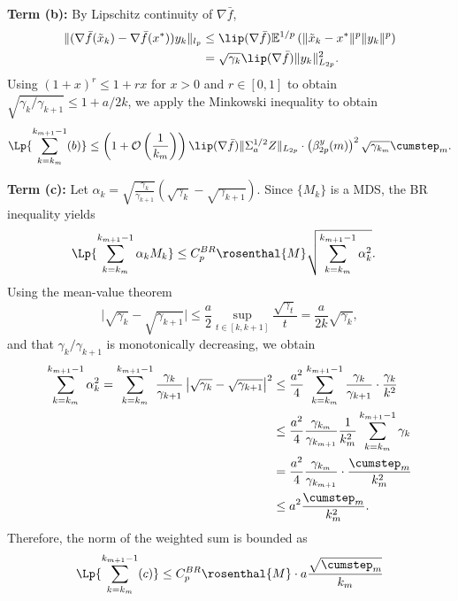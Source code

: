 \documentclass[11pt]{article}
\begin{document}
\textbf{Term (b):}
By Lipschitz continuity of $\nabla \bar{f}$, 
\begin{align*}
    \lVert  (\nabla\bar{f}(\tilde{x}_k) - \nabla \bar{f}(x^*)) y_k \rVert_{l_p}
    &\leq 
    \lip(\nabla \bar{f}) \mathbb{E}^{1/p}\left(\lVert \tilde{x}_k - x^* \rVert^p \lVert y_k \rVert^p \right)
    \\ &
    = \sqrt{\gamma_k} \lip(\nabla \bar{f}) \lVert y_k \rVert_{L_{2p}}^2 
    . 
\end{align*}
Using $(1 + x)^r \leq 1 + r x$ for $x > 0$ and $r \in [0, 1]$ to obtain $\sqrt{\gamma_k/\gamma_{k+1}} \leq 1 + a/2k$, we apply the Minkowski inequality to obtain
\begin{equation}\label{eq:bbound}
\begin{split}
    \Lp{\sum_{k=k_m}^{k_{m+1} - 1} (b)}
    \leq  
    \left(1 + \mathcal{O}\left( \frac{1}{k_m}\right) \right) \lip(\nabla \bar{f}) \lVert \Sigma_a^{1/2} Z \rVert_{L_{2p}} 
    \cdot \left(\beta_{2p}^y (m) \right)^2 \sqrt{\gamma_{k_m}}\cumstep_m
     .
\end{split}
\end{equation}


\textbf{Term (c):}
Let $\alpha_k = \sqrt{\frac{\gamma_k}{\gamma_{k+1}}} (\sqrt{\gamma_k} - \sqrt{\gamma_{k+1}})$. 
Since $\{M_k\}$ is a MDS, the BR inequality yields
\begin{align*}
    \Lp{\sum_{k=k_m}^{k_{m+1} - 1} \alpha_k M_k } 
    &\leq 
    C_p^{BR} \rosenthal{M} \sqrt{\sum_{k=k_m}^{k_{m+1} - 1} \alpha_k^2} . 
\end{align*}
Using the mean-value theorem 
\begin{equation*}
    \lvert \sqrt{\gamma_k} - \sqrt{\gamma_{k+1}} \rvert 
    \leq 
    \frac{a}{2} \sup_{t \in [k, k+1]} \frac{\sqrt{\gamma_t}}{t}
    = 
    \frac{a}{2k} \sqrt{\gamma_k} ,    
\end{equation*}
and that $\gamma_k/\gamma_{k+1}$ is monotonically decreasing, we obtain 
\begin{align*}
    \sum_{k=k_m}^{k_{m+1} - 1} \alpha_k^2 
    = \sum_{k=k_m}^{k_{m+1}-1} \frac{\gamma_k}{\gamma_{k+1}} \left\lvert \sqrt{\gamma_k} - \sqrt{\gamma_{k+1}}\right\rvert^2
    &\leq 
    \frac{a^2}{4} \sum_{k=k_m}^{k_{m+1} - 1} \frac{\gamma_{k}}{\gamma_{k+1} } \cdot \frac{\gamma_k}{k^2} 
    \\ &\leq\frac{a^2}{4} \frac{\gamma_{k_m}}{\gamma_{k_{m+1}}} \frac{1}{k_m^2} \sum_{k=k_m}^{k_{m+1} - 1} \gamma_k 
    \\ &=\frac{a^2}{4} \frac{\gamma_{k_m}}{\gamma_{k_{m+1}}} \cdot \frac{\cumstep_m}{k_m^2}
    \\ &
    \leq a^2 \frac{\cumstep_m}{k_m^2}
    .
\end{align*}
Therefore, the norm of the weighted sum is bounded as
\begin{equation}\label{eq:cbound}
    \Lp{\sum_{k=k_m}^{k_{m+1} - 1} (c)}
    \leq C_p^{BR}\rosenthal{M}\cdot a\frac{\sqrt{\cumstep_m}}{k_m}      
\end{equation}
\end{document}
